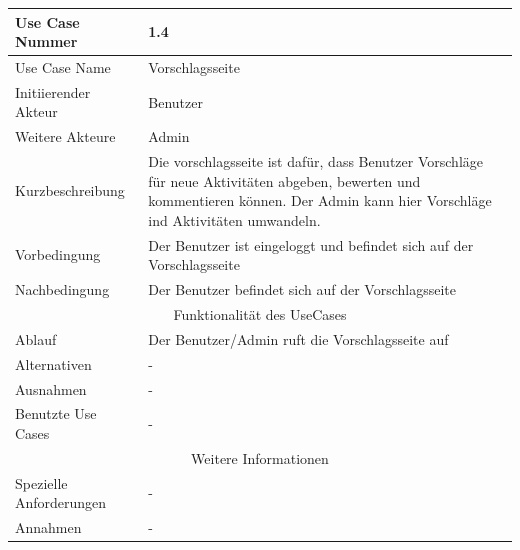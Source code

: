 \documentclass[10pt,a4paper]{article}
\begin{document}
\begin{tabular}{|l|p{.5\linewidth}|}
		\hline Use Case Nummer & 1.4\\ 
		\hline Use Case Name & Vorschlagsseite \\ 
		\hline Initiierender Akteur & Benutzer \\
		\hline Weitere Akteure & Admin \\
		\hline Kurzbeschreibung & Die vorschlagsseite ist dafür, dass Benutzer Vorschl\"age für neue Aktivit\"aten abgeben, bewerten und kommentieren k\"onnen. Der Admin kann hier Vorschl\"age ind Aktivit\"aten umwandeln.\\
		\hline Vorbedingung & Der Benutzer ist eingeloggt und befindet sich auf der Vorschlagsseite \\
		\hline Nachbedingung & Der Benutzer befindet sich auf der Vorschlagsseite \\
		\hline \multicolumn{2}{|c|}{Funktionalität des UseCases}\\
		\hline Ablauf & Der Benutzer/Admin ruft die Vorschlagsseite auf \\
		\hline Alternativen & - \\
		\hline Ausnahmen & - \\
		\hline Benutzte Use Cases & - \\
		\hline \multicolumn{2}{|c|}{Weitere Informationen} \\
		\hline Spezielle Anforderungen & - \\
		\hline Annahmen & - \\
		\hline
	\end{tabular}
\end{document}

